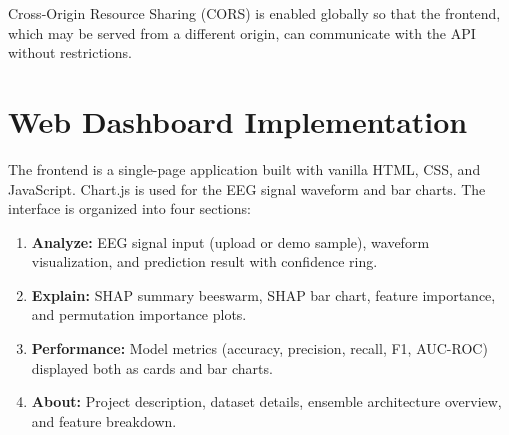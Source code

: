 Cross-Origin Resource Sharing (CORS) is enabled globally so that the frontend, which may be served from a different origin, can communicate with the API without restrictions.

\section{Web Dashboard Implementation}

The frontend is a single-page application built with vanilla HTML, CSS, and JavaScript. Chart.js is used for the EEG signal waveform and bar charts. The interface is organized into four sections:

\begin{enumerate}
    \item \textbf{Analyze:} EEG signal input (upload or demo sample), waveform visualization, and prediction result with confidence ring.
    \item \textbf{Explain:} SHAP summary beeswarm, SHAP bar chart, feature importance, and permutation importance plots.
    \item \textbf{Performance:} Model metrics (accuracy, precision, recall, F1, AUC-ROC) displayed both as cards and bar charts.
    \item \textbf{About:} Project description, dataset details, ensemble architecture overview, and feature breakdown.
\end{enumerate}
